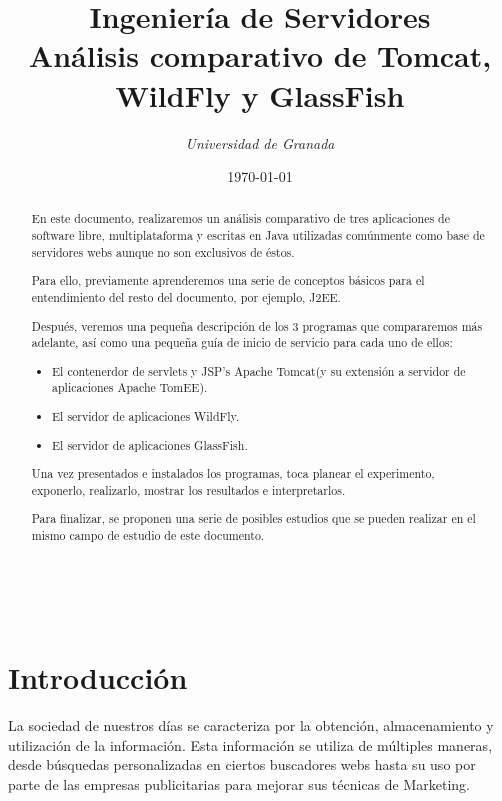 \documentclass[a4paper, 10pt]{article}
\title{\textbf{Ingeniería de Servidores}\\ %
Análisis comparativo de Tomcat, WildFly y GlassFish} %
\author{ %
{\textit{Universidad de Granada}}} %
\date{\today} %
\makeatletter
\renewcommand{\maketitle}{
  \begin{flushright} %
  
  {\LARGE\@title} %
  
  \vspace{50pt} %
  
  {\large\@author} %
  \\\@date %
  \vspace{40pt} %
  \end{flushright}
}
\makeatother
\begin{document}
\maketitle %

\renewcommand{\abstractname}{Resumen} %
\begin{abstract}
	 En este documento, realizaremos un análisis comparativo de tres aplicaciones
	 de software libre, multiplataforma y escritas en Java utilizadas comúnmente
	 como base de servidores webs aunque no son exclusivos de éstos.
	 
	 Para ello, previamente aprenderemos una serie de conceptos básicos para el
	 entendimiento del resto del documento, por ejemplo, J2EE.
	 
	 Después, veremos una pequeña descripción de los 3 programas que compararemos
	 más adelante, así como una pequeña guía de inicio de servicio para cada uno
	 de ellos:
	 
	 \begin{itemize}
	 	\item El contenerdor de servlets y JSP's Apache Tomcat(y su extensión a 
	 	servidor de aplicaciones Apache TomEE).
	 	\item El servidor de aplicaciones WildFly.
	 	\item El servidor de aplicaciones GlassFish.
	 \end{itemize}
	 
	 Una vez presentados e instalados los programas, toca planear el experimento,
	 exponerlo, realizarlo, mostrar los resultados e interpretarlos.
	 
	 Para finalizar, se proponen una serie de posibles estudios que se pueden
	 realizar en el mismo campo de estudio de este documento.
\end{abstract}



\section{Introducción}
	La sociedad de nuestros días se caracteriza por la obtención, almacenamiento y
	utilización de la información. Esta información se utiliza de múltiples maneras,
	desde búsquedas personalizadas en ciertos buscadores webs hasta su uso por parte
	de las empresas publicitarias para mejorar sus técnicas de Marketing.
	
\end{document}
